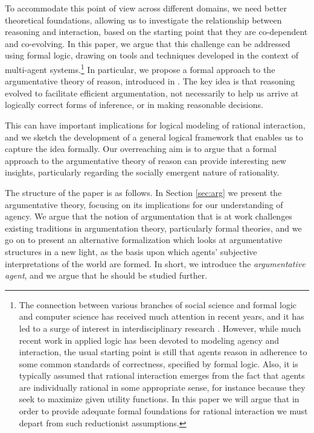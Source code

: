 \documentclass[greybox]{svmult}
\begin{document}
To accommodate this point of view across different domains, we need better theoretical foundations, allowing us to investigate the relationship between reasoning and interaction, based on the starting point that they are co-dependent and co-evolving. In this paper, we argue that this challenge can be addressed using formal logic, drawing on tools and techniques developed in the context of multi-agent systems.\footnote{The connection between various branches of social science and formal logic and computer science has received much attention in recent years, and it has led to a surge of interest in interdisciplinary research \cite{parikh,benthem2,verbrugge}. However, while much recent work in applied logic has been devoted to modeling agency and interaction, the usual starting point is still that agents reason in adherence to some common standards of correctness, specified by formal logic. Also, it is typically assumed that rational interaction emerges from the fact that agents are individually rational in some appropriate sense, for instance because they seek to maximize given utility functions. In this paper we will argue that in order to provide adequate formal foundations for rational interaction we must depart from such reductionist assumptions.} In particular, we propose a formal approach to the argumentative theory of reason, introduced in \cite{mercier}. The key idea is that reasoning evolved to facilitate efficient argumentation, not necessarily to help us arrive at logically correct forms of inference, or in making reasonable decisions.

This can have important implications for logical modeling of rational interaction, and we sketch the development of a general logical framework that enables us to capture the idea formally. Our overreaching aim is to argue that a formal approach to the argumentative theory of reason can provide interesting new insights, particularly regarding the socially emergent nature of rationality. 

The structure of the paper is as follows. In Section \ref{sec:arg} we present the argumentative theory, focusing on its implications for our understanding of agency. We argue that the notion of argumentation that is at work challenges existing traditions in argumentation theory, particularly formal theories, and we go on to present an alternative formalization which looks at argumentative structures in a new light, as the basis upon which agents' subjective interpretations of the world are formed. In short, we introduce the \emph{argumentative agent}, and we argue that he should be studied further.
\end{document}
